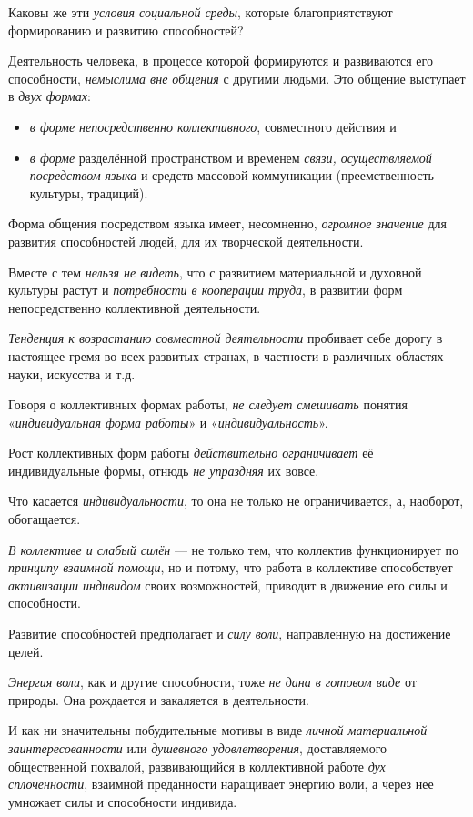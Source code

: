 \documentclass[a4paper,14pt,russian]{extreport}
\begin{document}
Каковы же эти \emph{условия социальной среды}, которые благоприятствуют формированию и развитию способностей?

Деятельность человека, в процессе которой формируются и развиваются его способности, \emph{немыслима вне общения} с другими людьми. Это общение выступает в \emph{двух формах}:

\begin{itemize}
\item \emph{в форме непосредственно коллективного}, совместного действия и
\item \emph{в форме} разделённой пространством и временем \emph{связи, осуществляемой посредством языка} и средств массовой коммуникации (преемственность культуры, традиций).
\end{itemize}

Форма общения посредством языка имеет, несомненно, \emph{огромное значение} для развития способностей людей, для их творческой деятельности.

Вместе с тем \emph{нельзя не видеть}, что с развитием материальной и духовной культуры растут и \emph{потребности в кооперации труда}, в развитии форм непосредственно коллективной деятельности.

\emph{Тенденция к возрастанию совместной деятельности} пробивает себе дорогу в настоящее гремя во всех развитых странах, в частности в различных областях науки, искусства и т.д.

Говоря о коллективных формах работы, \emph{не следует смешивать} понятия «\emph{индивидуальная форма работы}» и «\emph{индивидуальность}».

Рост коллективных форм работы \emph{действительно ограничивает} её индивидуальные формы, отнюдь \emph{не упраздняя} их вовсе.

Что касается \emph{индивидуальности}, то она не только не ограничивается, а, наоборот, обогащается.

\emph{В коллективе и слабый силён} --- не только тем, что коллектив функционирует по \emph{принципу взаимной помощи}, но и потому, что работа в коллективе способствует \emph{активизации индивидом} своих возможностей, приводит в движение его силы и способности.

Развитие способностей предполагает и \emph{силу воли}, направленную на достижение целей.

\emph{Энергия воли}, как и другие способности, тоже \emph{не дана в готовом виде} от природы. Она рождается и закаляется в деятельности.

И как ни значительны побудительные мотивы в виде \emph{личной материальной заинтересованности} или \emph{душевного удовлетворения}, доставляемого общественной похвалой, развивающийся в коллективной работе \emph{дух сплоченности}, взаимной преданности наращивает энергию воли, а через нее умножает силы и способности индивида.
\end{document}
